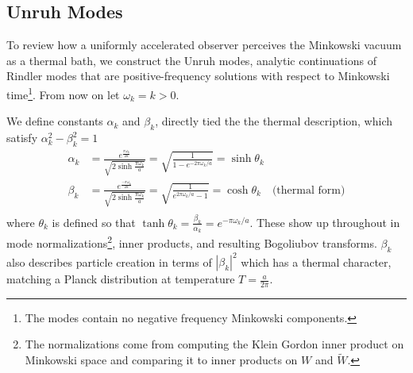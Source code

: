 \documentclass[12pt,a4paper]{article}
\begin{document}
\subsection{Unruh Modes}
To review how a uniformly accelerated observer perceives the Minkowski vacuum as a thermal bath, we construct the Unruh modes\cite{unruh1976notes}, analytic continuations of Rindler modes that are positive-frequency solutions with respect to Minkowski time\footnote{The modes contain no negative frequency Minkowski components.}. From now on let $\omega_k = k > 0$.

We define constants $\alpha_k$ and $\beta_k$, directly tied the the thermal description, which satisfy $\alpha_k^2 - \beta_k^2 = 1$
\begin{equation}
  \begin{aligned}
    \alpha_k &= \frac{e^{\frac{\pi\omega_k}{2a}}}{\sqrt{2 \sinh \frac{\pi \omega_k}{a}}} = \sqrt{\frac{1}{1 - e^{-2\pi\omega_k / a}}} = \sinh \theta_k \\
    \beta_k &= \frac{e^{\frac{-\pi\omega_k}{2a}}}{\sqrt{2 \sinh \frac{\pi \omega_k}{a}}} = \sqrt{\frac{1}{e^{2\pi\omega_k / a} - 1}} = \cosh \theta_k \quad \text{(thermal form)} \\
  \end{aligned}
  \label{alpha_beta}
\end{equation}
where $\theta_k$ is defined so that $\tanh{\theta_k} = \frac{\beta_k}{\alpha_k} = e^{-\pi\omega_k / a}$. These show up throughout in mode normalizations\footnote{The normalizations come from computing the Klein Gordon inner product on Minkowski space and comparing it to inner products on $W$ and $\widetilde{W}$.}, inner products, and resulting Bogoliubov transforms. $\beta_k$ also describes particle creation in terms of $|\beta_k|^2$ which has a thermal character, matching a Planck distribution at temperature $T = \frac{a}{2\pi}$.
\end{document}
